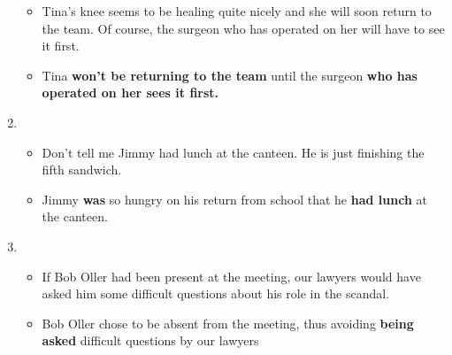 \documentclass[a4paper]{article}
\begin{document}
\begin{enumerate}
\begin{itemize}
        \item Tina's knee seems to be healing quite nicely and she will soon return to the team. Of course, the surgeon who has operated on her will have to see it first.
        \item Tina {\bf won't be returning to the team} until the surgeon {\bf who has operated on her sees it first.}
    \end{itemize}
    \item \begin{itemize}
        \item Don't tell me Jimmy had lunch at the canteen. He is just finishing the fifth sandwich.
        \item Jimmy {\bf was} so hungry on his return from school that he {\bf had lunch} at the canteen.
    \end{itemize}
    \item \begin{itemize}
        \item If Bob Oller had been present at the meeting, our lawyers would have asked him some difficult questions about his role in the scandal.
        \item Bob Oller chose to be absent from the meeting, thus avoiding {\bf being asked} difficult questions by our lawyers
    \end{itemize}
\end{enumerate}
\end{document}
